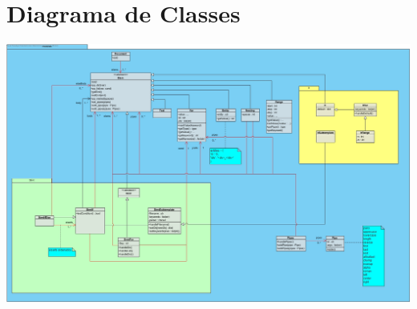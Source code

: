 \documentclass[11pt]{report}
\begin{document}
\section{Diagrama de Classes} \label{sec:classes}
\begin{landscape}
    \centering
    \includegraphics[width=\linewidth]{assets/class_diagram.jpg}
\end{landscape}
%
%
%
% 
% 


\end{document}
